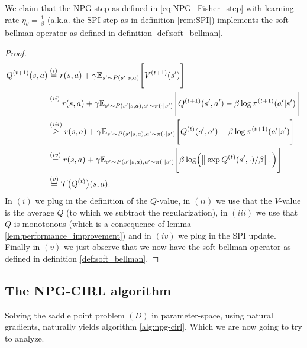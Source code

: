 \begin{claim}
    \label{claim:SPI_impelements_soft_bellman}
    We claim that the NPG step as defined in \ref{eq:NPG_Fisher_step} with learning rate $\eta_\theta=\frac{1}{\beta}$ (a.k.a. the SPI step as in definition \ref{rem:SPI}) implements the soft bellman operator as defined in definition \ref{def:soft_bellman}.
    \begin{proof}
        \begin{align*}
            {Q}^{(t+1)}(s,a) &\stackrel{(i)}{=} r(s,a) + \gamma \mathbb{E}_{s' \sim P(s'|s,a)} \Bigg[
                V^{(t+1)}(s')
            \Bigg] \\
            &\stackrel{(ii)}{=}  r(s,a) + \gamma \mathbb{E}_{s' \sim P(s'|s,a),a'\sim\pi(\cdot|s')} \Bigg[
                Q^{(t+1)}(s',a') - \beta \log\pi^{(t+1)}(a'|s')
            \Bigg] \\
            &\stackrel{(iii)}{\geq} r(s,a) + \gamma \mathbb{E}_{s' \sim P(s'|s,a),a'\sim\pi(\cdot|s')} \Bigg[
                Q^{(t)}(s',a') - \beta \log\pi^{(t+1)}(a'|s')
            \Bigg] \\
            &\stackrel{(iv)}{=}  r(s,a) + \gamma \mathbb{E}_{s' \sim P(s'|s,a),a'\sim\pi(\cdot|s')} \Bigg[
                \beta \log \Bigl( \big\| \exp  Q^{(t)}(s',\cdot) / \beta \big\|_1 \Bigr)
            \Bigg] \\
            &\stackrel{(v)}{=}  \mathcal{T}\big({Q}^{(t)}\big)(s,a).
        \end{align*}
        In $(i)$ we plug in the definition of the $Q$-value, in $(ii)$ we use that the $V$-value is the average $Q$ (to which we subtract the regularization), in $(iii)$ we use that $Q$ is monotonous (which is a consequence of lemma \ref{lem:performance_improvement}) and in $(iv)$ we plug in the SPI update. Finally in $(v)$ we just observe that we now have the soft bellman operator as defined in definition \ref{def:soft_bellman}. 
    \end{proof}
\end{claim}

\subsection{The NPG-CIRL algorithm}
Solving the saddle point problem $(D)$ in parameter-space, using natural gradients, naturally yields algorithm \ref{alg:npg-cirl}. Which we are now going to try to analyze.

